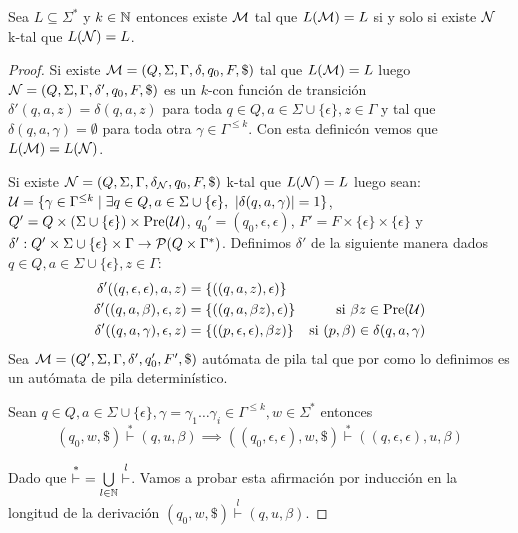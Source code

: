 \documentclass[tesis.tex]{subfiles}
\begin{document}
\begin{prop}
	\label{prop:equiv_kapnd_apnd}
	Sea $L \subseteq \Sigma^{*}$ y $k \in \mathbb{N}$ entonces existe $\cal M$ \APD tal que $L({\cal M}) =  L$ si y solo si existe ${\cal N}$ k-\APD tal que $L({\cal N}) = L$. 
\end{prop}
\begin{proof}
	Si existe ${\cal M} = (Q, \Sigma, \Gamma, \delta, q_0, F, \$)$ \APD tal que $L({\cal M}) = L$ luego ${\cal N} = (Q, \Sigma, \Gamma, \delta', q_0, F, \$)$ es un $k$-\APD con función de transición $\delta'(q,a,z) = \delta(q,a,z)$ para toda 
	$q \in Q, a \in \Sigma \cup \{\epsilon\}, z \in \Gamma$ y tal que $\delta(q,a,\gamma) = \emptyset$ para toda otra $\gamma \in \Gamma^{\le k}$.
	Con esta definicón vemos que $L({\cal M}) = L({\cal N})$.	
	

	Si existe ${\cal N} = (Q, \Sigma, \Gamma, \delta_{\cal N}, q_0, F, \$)$ k-\APD tal que $L({\cal N}) = L$ luego sean:
	${\cal U} = \{ \gamma \in \Gamma^{\le k} \mid \exists q \in Q, a \in \Sigma \cup \{\epsilon\}, \ |\delta(q,a,\gamma)| = 1 \}$,
	$Q' =  Q \times (\Sigma \cup \{\epsilon\}) \times \text{Pre}({\cal U})$,
	$q_{0}' = (q_{0}, \epsilon, \epsilon)$, 
	$F' = F \times \{\epsilon\} \times \{\epsilon\}$
	y $\delta': Q' \times \Sigma  \cup \{ \epsilon\} \times \Gamma \to {\cal P}(Q \times \Gamma^{*})$.
	Definimos $\delta'$ de la siguiente manera dados
	$q \in Q, a \in \Sigma \cup \{ \epsilon \}, z \in \Gamma$:
	\begin{align*}
		\delta' ((q,\epsilon,\epsilon),a,z) &= \{ ((q,a,z),\epsilon) \} 
		& \\
		\delta' ((q,a,\beta),\epsilon,z) 
		&= \{((q,a,\beta z),\epsilon)\} 
		& \text{si} \ \beta z \in \text{Pre}({\cal U}) \\
		\delta' ((q,a,\gamma),\epsilon,z) &= \{((p,\epsilon,\epsilon),\beta z)\}
		& \text{si} \  (p,\beta) \in \delta(q,a,\gamma) 
	\end{align*}
	Sea ${\cal M} = (Q', \Sigma, \Gamma, \delta', q_{0}', F', \$)$ autómata de pila tal que por como lo definimos es un autómata de pila determinístico.
	\begin{aff}
	Sean $q \in Q, a \in \Sigma \cup \{ \epsilon \}, \gamma = \gamma_{1} \dots \gamma_{i} \in \Gamma^{\le k}, w \in \Sigma^{*}$
	entonces  
	\[ 
		(q_{0},w,\$) \overset{*}{\vdash} (q,u,\beta) 
		\implies
		((q_{0},\epsilon,\epsilon), w, \$) \overset{*}{\vdash} 
		((q,\epsilon,\epsilon), u, \beta) 	
	\]	
	\end{aff}
	Dado que $\overset{*}{\vdash} \ = \underset{l \in \mathbb{N}}{\bigcup} \overset{l}{\vdash}$.
	Vamos a probar esta afirmación por inducción en la longitud de la derivación $(q_{0},w,\$) \overset{l}{\vdash} (q,u,\beta)$.


\end{proof}
\end{document}
